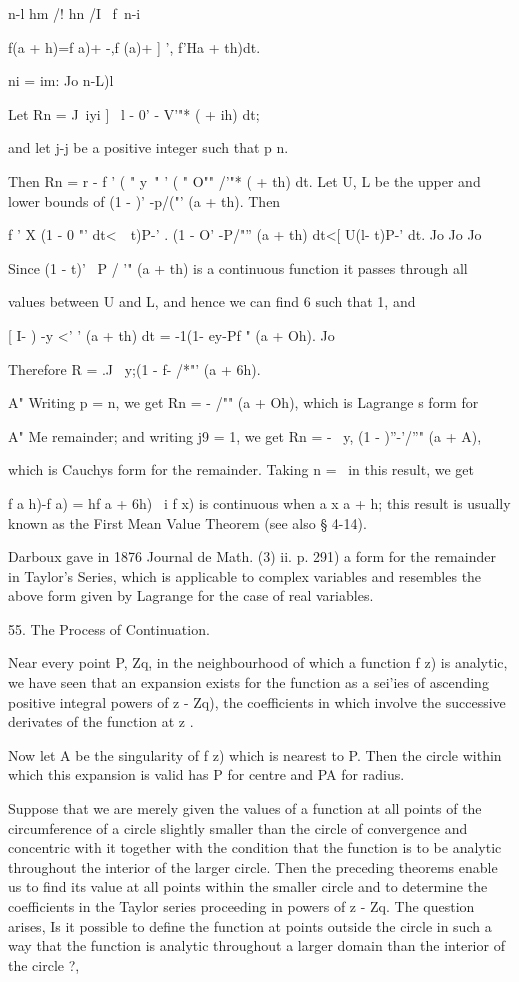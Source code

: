 {{n-l hm /! hn /I \ f\ n-i

f(a + h)=f a)+ -,f (a)+ ] ', f'Ha + th)dt.

ni = im: Jo n-L)l

Let Rn = J~iyi ] \ l - 0' - V'"* ( + ih) dt;

and let j-j be a positive integer such that p n.

%
%

Then Rn = r - f ' ( " y~" ' ( " O"" /'"* ( + th) dt. Let U, L be the
upper and lower bounds of (1 - )' -p/("' (a + th). Then

f ' X (1 - 0 "' dt<\ \ t)P-' . (1 - O' -P/"'' (a + th) dt<[ U(l- t)P-'
dt. Jo Jo Jo

Since (1 - t)' ~P / '" (a + th) is a continuous function it passes
through all

values between U and L, and hence we can find 6 such that 1, and

[ I- ) -y <' ' (a + th) dt = -1(1- ey-Pf " (a + Oh). Jo

Therefore R = .J \ y;(1 - f- /*"' (a + 6h).

A" Writing p = n, we get Rn = - /"" (a + Oh), which is Lagrange s form
for

A" Me remainder; and writing j9 = 1, we get Rn = - \, y, (1 -
)''-'/''" (a + A),

which is Cauchys form for the remainder. Taking n = \ in this result,
we get

f a h)-f a) = hf a + 6h) \ i f x) is continuous when a x a + h; this
result is usually known as the First Mean Value Theorem (see also §
4-14).

Darboux gave in 1876 Journal de Math. (3) ii. p. 291) a form for the
remainder in Taylor's Series, which is applicable to complex variables
and resembles the above form given by Lagrange for the case of real
variables.

55. The Process of Continuation.

Near every point P, Zq, in the neighbourhood of which a function f z)
is analytic, we have seen that an expansion exists for the function as
a sei'ies of ascending positive integral powers of z - Zq), the
coefficients in which involve the successive derivates of the function
at z .

Now let A be the singularity of f z) which is nearest to P. Then the
circle within which this expansion is valid has P for centre and PA
for radius.

Suppose that we are merely given the values of a function at all
points of the circumference of a circle slightly smaller than the
circle of convergence and concentric with it together with the
condition that the function is to be analytic throughout the interior
of the larger circle. Then the preceding theorems enable us to find
its value at all points within the smaller circle and to determine the
coefficients in the Taylor series proceeding in powers of z - Zq. The
question arises, Is it possible to define the function at points
outside the circle in such a way that the function is analytic
throughout a larger domain than the interior of the circle ?,

}}
